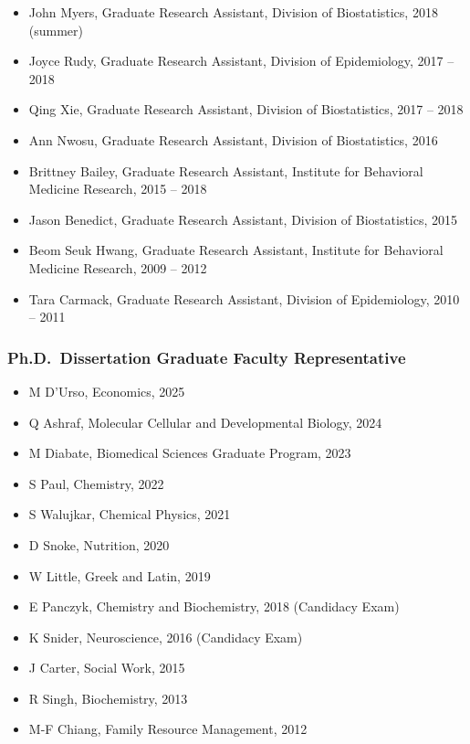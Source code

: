 \documentclass[
  english,
  letterpaper,
  DIV=11,
  numbers=noendperiod]{scrartcl}
\providecommand{\tightlist}{%
  \setlength{\itemsep}{0pt}\setlength{\parskip}{0pt}}
\begin{document}
\begin{itemize}
\tightlist
\item
  John Myers, Graduate Research Assistant, Division of Biostatistics,
  2018 (summer)
\item
  Joyce Rudy, Graduate Research Assistant, Division of Epidemiology,
  2017 -- 2018
\item
  Qing Xie, Graduate Research Assistant, Division of Biostatistics, 2017
  -- 2018
\item
  Ann Nwosu, Graduate Research Assistant, Division of Biostatistics,
  2016
\item
  Brittney Bailey, Graduate Research Assistant, Institute for Behavioral
  Medicine Research, 2015 -- 2018
\item
  Jason Benedict, Graduate Research Assistant, Division of
  Biostatistics, 2015
\item
  Beom Seuk Hwang, Graduate Research Assistant, Institute for Behavioral
  Medicine Research, 2009 -- 2012
\item
  Tara Carmack, Graduate Research Assistant, Division of Epidemiology,
  2010 -- 2011
\end{itemize}

\subsubsection{Ph.D.~Dissertation Graduate Faculty
Representative}\label{ph.d.-dissertation-graduate-faculty-representative}

\begin{itemize}
\tightlist
\item
  M D'Urso, Economics, 2025
\item
  Q Ashraf, Molecular Cellular and Developmental Biology, 2024
\item
  M Diabate, Biomedical Sciences Graduate Program, 2023
\item
  S Paul, Chemistry, 2022
\item
  S Walujkar, Chemical Physics, 2021
\item
  D Snoke, Nutrition, 2020
\item
  W Little, Greek and Latin, 2019
\item
  E Panczyk, Chemistry and Biochemistry, 2018 (Candidacy Exam)
\item
  K Snider, Neuroscience, 2016 (Candidacy Exam)
\item
  J Carter, Social Work, 2015
\item
  R Singh, Biochemistry, 2013
\item
  M-F Chiang, Family Resource Management, 2012
\end{itemize}
\end{document}
